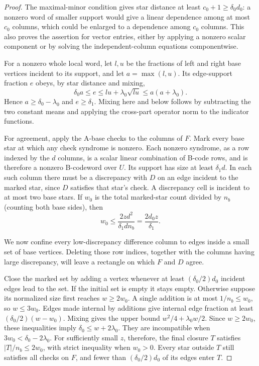 \begin{proof}
The maximal-minor condition gives star distance at least
$c_0+1\ge\delta_0d_0$: a nonzero word of smaller support would give a
linear dependence among at most $c_0$ columns, which could be enlarged
to a dependence among $c_0$ columns.  This also proves the assertion
for vector entries, either by applying a nonzero scalar component or
by solving the independent-column equations componentwise.

For a nonzero whole local word, let $l,u$ be the fractions of left and
right base vertices incident to its support, and let $a=\max(l,u)$.
Its edge-support fraction $e$ obeys, by star distance and mixing,
\[
 \delta_0a\le e\le lu+\lambda_0\sqrt{lu}
 \le a(a+\lambda_0).
\]
Hence $a\ge\delta_0-\lambda_0$ and $e\ge\delta_1$.  Mixing here and
below follows by subtracting the two constant means and applying the
cross-part operator norm to the indicator functions.

For agreement, apply the A-base checks to the columns of $F$.  Mark
every base star at which any check syndrome is nonzero.  Each nonzero
syndrome, as a row indexed by the $d$ columns, is a scalar linear
combination of B-code rows, and is therefore a nonzero B-codeword over
$U$.  Its support has size at least $\delta_1d$.  In each such column
there must be a discrepancy with $D$ on an edge incident to the marked
star, since $D$ satisfies that star's check.  A discrepancy cell is
incident to at most two base stars.  If $w_0$ is the total marked-star
count divided by $n_b$ (counting both base sides), then
\begin{equation}\label{oc:marked-size}
 w_0\le \frac{2zd^2}{\delta_1dn_b}
       =\frac{2d_0z}{\delta_1}.
\end{equation}

We now confine every low-discrepancy difference column to edges inside
a small set of base vertices.  Deleting those row indices, together
with the columns having large discrepancy, will leave a rectangle on
which $F$ and $D$ agree.

Close the marked set by adding a vertex whenever at least
$(\delta_0/2)d_0$ incident edges lead to the set.  If the initial set
is empty it stays empty.  Otherwise suppose its normalized size first
reaches $w\ge2w_0$.  A single addition is at most $1/n_b\le w_0$, so
$w\le3w_0$.  Edges made internal by additions give internal edge
fraction at least $(\delta_0/2)(w-w_0)$.  Mixing gives the upper bound
$w^2/4+\lambda_0w/2$.  Since $w\ge2w_0$, these inequalities imply
$\delta_0\le w+2\lambda_0$.  They are incompatible when
$3w_0<\delta_0-2\lambda_0$.  For sufficiently small $z$, therefore,
the final closure $T$ satisfies $|T|/n_b\le2w_0$, with strict
inequality when $w_0>0$.
Every star outside $T$ still satisfies all checks on $F$, and fewer
than $(\delta_0/2)d_0$ of its edges enter $T$.


\end{proof}

